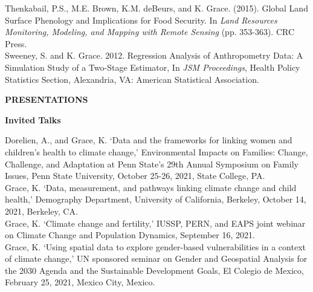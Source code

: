 \documentclass[11pt]{article} %
\begin{document}
\noindent
Thenkabail, P.S., M.E. Brown, K.M. deBeurs, and K. Grace. (2015). Global Land Surface Phenology and Implications for Food Security. In \textit{Land Resources Monitoring, Modeling, and Mapping with Remote Sensing} (pp. 353-363). CRC Press. \\

\noindent
Sweeney, S. and K. Grace. 2012. Regression Analysis of Anthropometry
Data: A Simulation Study of a Two-Stage Estimator, In \textit{JSM
Proceedings}, Health Policy Statistics Section, Alexandria, VA:
American Statistical Association. \\



\vspace{.5cm}

\noindent
{\large \textbf{PRESENTATIONS}}
\vspace{.5cm}

\noindent
\textbf {Invited Talks}


\noindent
Dorelien, A., and Grace, K.  `Data and the frameworks for linking women and children’s health to climate change,' Environmental Impacts on Families: Change, Challenge, and Adaptation at Penn State’s 29th Annual Symposium on Family Issues, Penn State University,  October 25-26, 2021, State College, PA.\\

\noindent
Grace, K. `Data, measurement, and pathways linking climate change and child health,' Demography Department, University of California, Berkeley, October 14, 2021, Berkeley, CA.\\

\noindent
Grace, K. `Climate change and fertility,' IUSSP, PERN, and EAPS joint webinar on Climate Change and Population Dynamics, September 16, 2021.\\

\noindent
Grace, K.  `Using spatial data to explore gender-based vulnerabilities in a context of climate change,'
UN sponsored seminar on Gender and Geospatial Analysis for the 2030 Agenda and the Sustainable Development Goals, El Colegio de Mexico, February 25, 2021, Mexico City, Mexico.\\
\end{document}
